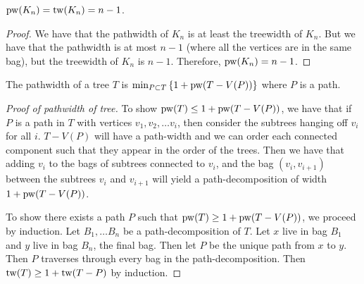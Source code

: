 \begin{example}
	\(\operatorname{pw}(K_n) = \operatorname{tw}(K_n) = n - 1\).
\end{example}
\begin{proof}
	We have that the pathwidth of \(K_n\) is at least the treewidth of \(K_n\). But we have that the pathwidth is at most \(n- 1\) (where all the vertices are in the same bag), but the treewidth of \(K_n\) is \(n - 1\). Therefore, \(\operatorname{pw}(K_n) = n - 1\).
\end{proof}

\begin{theorem}
	The pathwidth of a tree \(T\) is \(\min_{P \subset T} \left\lbrace 1 + \operatorname{pw}(T - V(P))\right\rbrace \) where \(P\) is a path.
\end{theorem}

\begin{proof}[Proof of pathwidth of tree]
	To show \(\operatorname{pw}(T) \leq 1 + \operatorname{pw}(T - V(P))\), we have that if \(P\) is a path in \(T\) with vertices \(v_1, v_2, \ldots v_i\), then consider the subtrees hanging off \(v_i\) for all \(i\). \(T - V(P)\) will have a path-width and we can order each connected component such that they appear in the order of the trees. Then we have that adding \(v_i\) to the bags of subtrees connected to \(v_i\), and the bag \((v_i, v_{i+1})\) between the subtrees \(v_i\) and \(v_{i + 1}\) will yield a path-decomposition of width \(1 + \operatorname{pw}(T - V(P))\).
	\par
	To show there exists a path \(P\) such that \(\operatorname{pw}(T) \geq 1 + \operatorname{pw}(T - V(P))\), we proceed by induction. Let \(B_1, \ldots B_n\) be a path-decomposition of \(T\). Let \(x\) live in bag \(B_1\) and \(y\) live in bag \(B_n\), the final bag. Then let \(P\) be the unique path from \(x\) to \(y\). Then \(P\) traverses through every bag in the path-decomposition. Then \(\operatorname{tw}(T) \geq 1 + \operatorname{tw}(T - P)\) by induction.
\end{proof}
